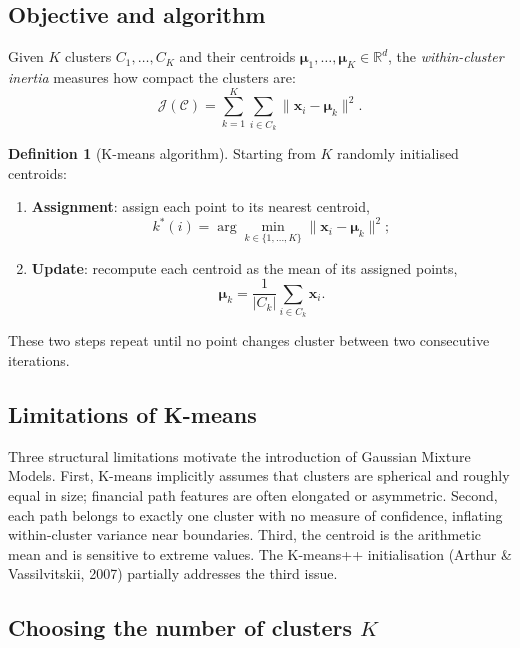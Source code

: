 \documentclass[12pt, a4paper]{report}
\theoremstyle{definition}
\newtheorem{definition}{Definition}[chapter]
\newcommand{\R}{\mathbb{R}}
\begin{document}
\subsection{Objective and algorithm}

Given $K$ clusters $C_1, \ldots, C_K$ and their centroids
$\boldsymbol{\mu}_1, \ldots, \boldsymbol{\mu}_K \in \R^d$, the
\emph{within-cluster inertia} measures how compact the clusters are:
\begin{equation}
    \mathcal{J}(\mathcal{C}) = \sum_{k=1}^{K} \sum_{i \in C_k}
    \|\mathbf{x}_i - \boldsymbol{\mu}_k\|^2.
    \label{eq:kmeans-objective}
\end{equation}

\begin{definition}[K-means algorithm]
Starting from $K$ randomly initialised centroids:
\begin{enumerate}
    \item \textbf{Assignment}: assign each point to its nearest centroid,
    \[
        k^*(i) = \arg\min_{k \in \{1,\ldots,K\}}
        \|\mathbf{x}_i - \boldsymbol{\mu}_k\|^2;
    \]
    \item \textbf{Update}: recompute each centroid as the mean of its
    assigned points,
    \[
        \boldsymbol{\mu}_k
        = \frac{1}{|C_k|}\sum_{i \in C_k} \mathbf{x}_i.
    \]
\end{enumerate}
These two steps repeat until no point changes cluster between two
consecutive iterations.
\end{definition}

\subsection{Limitations of K-means}
\label{sec:kmeans-limitations}

Three structural limitations motivate the introduction of Gaussian
Mixture Models.  First, K-means implicitly assumes that clusters are
spherical and roughly equal in size; financial path features are often
elongated or asymmetric.  Second, each path belongs to exactly one
cluster with no measure of confidence, inflating within-cluster variance
near boundaries.  Third, the centroid is the arithmetic mean and is
sensitive to extreme values.  The K-means++ initialisation (Arthur \&
Vassilvitskii, 2007) partially addresses the third issue.

\subsection{Choosing the number of clusters $K$}
\end{document}

